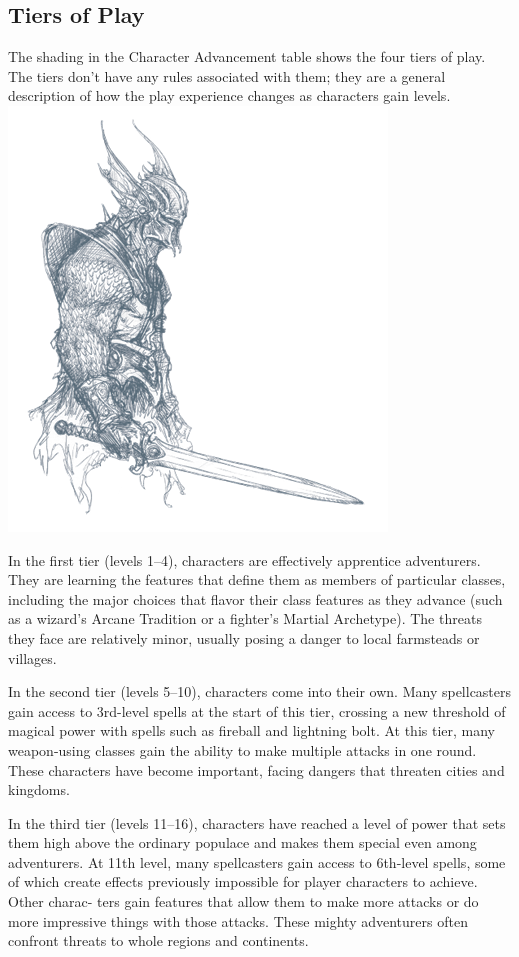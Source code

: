 \subsection{Tiers of Play}
The shading in the Character Advancement table shows the four tiers of play. The tiers don’t have any rules associated with them; they are a general description of how the play experience changes as characters gain levels.
\includegraphics{img/char01.png}

In the first tier (levels 1–4), characters are effectively apprentice adventurers. They are learning the features that define them as members of particular classes, including the major choices that flavor their class features as they advance (such as a wizard’s Arcane Tradition or a fighter’s Martial Archetype). The threats they face are relatively minor, usually posing a danger to local farmsteads or villages.

In the second tier (levels 5–10), characters come into their own. Many spellcasters gain access to 3rd-level spells at the start of this tier, crossing a new threshold of magical power with spells such as fireball and lightning bolt. At this tier, many weapon-using classes gain the ability to make multiple attacks in one round. These characters have become important, facing dangers that threaten cities and kingdoms.

In the third tier (levels 11–16), characters have reached a level of power that sets them high above the ordinary populace and makes them special even among adventurers. At 11th level, many spellcasters gain access to 6th-level spells, some of which create effects previously impossible for player characters to achieve. Other charac- ters gain features that allow them to make more attacks or do more impressive things with those attacks. These mighty adventurers often confront threats to whole regions and continents.


